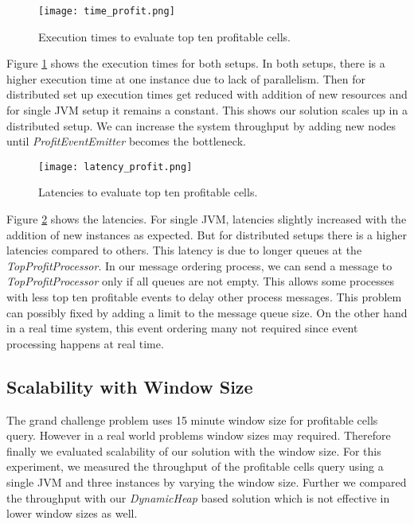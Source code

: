 \begin{figure}[!t]
        \centering
        \texttt{[image: time\_profit.png]}
        \caption{Execution times to evaluate top ten profitable cells.}
        \label{time_profit}
\end{figure}
 
Figure \ref{time_profit} shows the execution times for both setups. In both setups, there is a higher execution time at one instance due to lack of parallelism. Then for distributed set up execution times get reduced with addition of new resources and for single JVM setup it remains a constant. This shows our solution scales up in a distributed setup. We can increase the system throughput by adding new nodes until \textit{ProfitEventEmitter} becomes the bottleneck.


\begin{figure}[!t]
        \centering
        \texttt{[image: latency\_profit.png]}
        \caption{Latencies to evaluate top ten profitable cells.}
        \label{latency_profit}
\end{figure}

Figure \ref{latency_profit} shows the latencies. For single JVM, latencies slightly increased with the addition of new instances as expected. But for distributed setups there is a higher latencies compared to others. This latency is due to longer queues at the \textit{TopProfitProcessor}. In our message ordering process, we can send a message to \textit{TopProfitProcessor} only if all queues are not empty. This allows some processes with less top ten profitable events to delay other process messages. This problem can  possibly fixed by adding a limit to the message queue size. On the other hand in a real time system, this event ordering many not required since event processing happens at real time. 


\subsection{Scalability with Window Size}

The grand challenge problem uses 15 minute window size for profitable cells query. However in a real world problems window sizes may required. Therefore finally we evaluated scalability of our solution with the window size.  For this experiment, we measured the throughput of the profitable cells query using a single JVM and three instances by varying the window size. Further we compared the throughput with our \textit{DynamicHeap} based solution which is not effective in lower window sizes as well.

